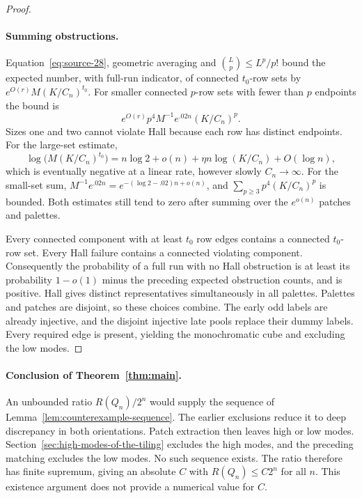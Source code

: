 \begin{proof}
\paragraph{Summing obstructions.}
Equation~\eqref{eq:source-28}, geometric averaging and
\(\binom Lp\le L^p/p!\) bound the expected number, with full-run
indicator, of connected \(t_0\)-row sets by
\(e^{O(r)}M(K/C_n)^{t_0}\). For smaller connected \(p\)-row sets
with fewer than \(p\) endpoints the bound is
\[
 e^{O(r)}p^4M^{-1}e^{.02n}(K/C_n)^p.
\]
Sizes one and two cannot violate Hall because each row has distinct
endpoints. For the large-set estimate,
\[
 \log\big(M(K/C_n)^{t_0}\big)
 =n\log2+o(n)+\eta n\log(K/C_n)+O(\log n),
\]
which is eventually negative at a linear rate, however slowly
\(C_n\to\infty\). For the small-set sum,
\(M^{-1}e^{.02n}=e^{-(\log2-.02)n+o(n)}\), and
\(\sum_{p\ge3}p^4(K/C_n)^p\) is bounded. Both estimates still tend
to zero after summing over the \(e^{o(n)}\) patches and palettes.

Every connected component with at least \(t_0\) row edges contains
a connected \(t_0\)-row set. Every Hall failure contains a connected
violating component. Consequently the probability of a full run with
no Hall obstruction is at least its probability \(1-o(1)\) minus
the preceding expected obstruction counts, and is positive. Hall gives
distinct representatives simultaneously in all palettes. Palettes
and patches are disjoint, so these choices combine. The early odd
labels are already injective, and the disjoint injective late pools
replace their dummy labels. Every required edge is present, yielding
the monochromatic cube and excluding the low modes.
\end{proof}

\paragraph{Conclusion of Theorem~\ref{thm:main}.}
An unbounded ratio \(R(Q_n)/2^n\) would supply the sequence of
Lemma~\ref{lem:counterexample-sequence}. The earlier exclusions reduce
it to deep discrepancy in both orientations. Patch extraction then
leaves high or low modes. Section~\ref{sec:high-modes-of-the-tiling}
excludes the high modes, and the preceding matching excludes the low
modes. No such sequence exists. The ratio therefore has finite
supremum, giving an absolute \(C\) with \(R(Q_n)\le C2^n\) for all
\(n\). This existence argument does not provide a numerical value
for \(C\).
